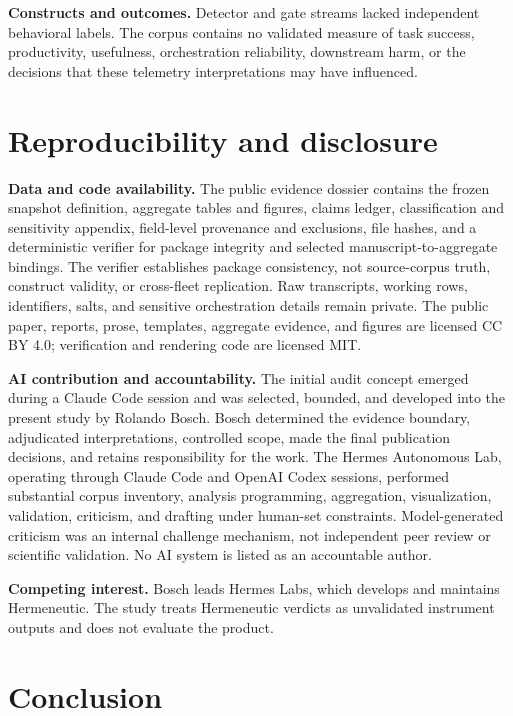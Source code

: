 \documentclass[12pt]{article}
\begin{document}
\textbf{Constructs and outcomes.} Detector and gate streams lacked independent behavioral labels. The corpus contains no validated measure of task success, productivity, usefulness, orchestration reliability, downstream harm, or the decisions that these telemetry interpretations may have influenced.

\section{Reproducibility and disclosure}\label{reproducibility-and-disclosure}

\textbf{Data and code availability.} The public evidence dossier contains the frozen snapshot definition, aggregate tables and figures, claims ledger, classification and sensitivity appendix, field-level provenance and exclusions, file hashes, and a deterministic verifier for package integrity and selected manuscript-to-aggregate bindings. The verifier establishes package consistency, not source-corpus truth, construct validity, or cross-fleet replication. Raw transcripts, working rows, identifiers, salts, and sensitive orchestration details remain private. The public paper, reports, prose, templates, aggregate evidence, and figures are licensed CC BY 4.0; verification and rendering code are licensed MIT.

\textbf{AI contribution and accountability.} The initial audit concept emerged during a Claude Code session and was selected, bounded, and developed into the present study by Rolando Bosch. Bosch determined the evidence boundary, adjudicated interpretations, controlled scope, made the final publication decisions, and retains responsibility for the work. The Hermes Autonomous Lab, operating through Claude Code and OpenAI Codex sessions, performed substantial corpus inventory, analysis programming, aggregation, visualization, validation, criticism, and drafting under human-set constraints. Model-generated criticism was an internal challenge mechanism, not independent peer review or scientific validation. No AI system is listed as an accountable author.

\textbf{Competing interest.} Bosch leads Hermes Labs, which develops and maintains Hermeneutic. The study treats Hermeneutic verdicts as unvalidated instrument outputs and does not evaluate the product.

\section{Conclusion}\label{conclusion}
\end{document}
